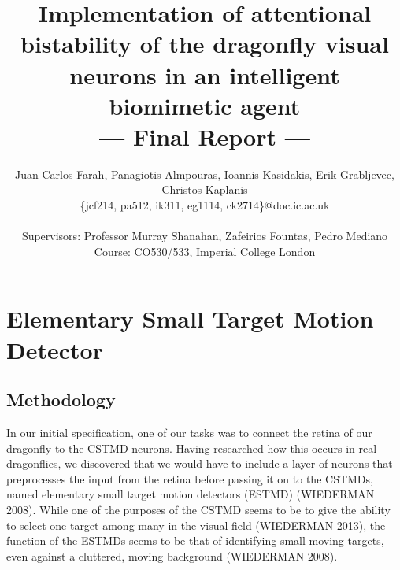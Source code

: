 \documentclass[a4paper,11pt]{article}
\title{Implementation of attentional bistability of the dragonfly visual neurons in an intelligent biomimetic agent\\\Large{--- Final Report ---}}
\author{Juan Carlos Farah, Panagiotis Almpouras, Ioannis Kasidakis, Erik Grabljevec, Christos Kaplanis\\
       \{jcf214, pa512, ik311, eg1114, ck2714\}@doc.ic.ac.uk\\ \\
       \small{Supervisors: Professor Murray Shanahan, Zafeirios Fountas, Pedro Mediano}\\
       \small{Course: CO530/533, Imperial College London}
}
\begin{document}
\maketitle
\section{Elementary Small Target Motion Detector}
\subsection{Methodology}

In our initial specification, one of our tasks was to connect the retina of our dragonfly to the CSTMD neurons. Having researched how this occurs in real dragonflies, we discovered that we would have to include a layer of neurons that preprocesses the input from the retina before passing it on to the CSTMDs, named elementary small target motion detectors (ESTMD) (WIEDERMAN 2008). While one of the purposes of the CSTMD seems to be to give the ability to select one target among many in the visual field (WIEDERMAN 2013), the function of the ESTMDs seems to be that of identifying small moving targets, even against a cluttered, moving background (WIEDERMAN 2008).
\end{document}
